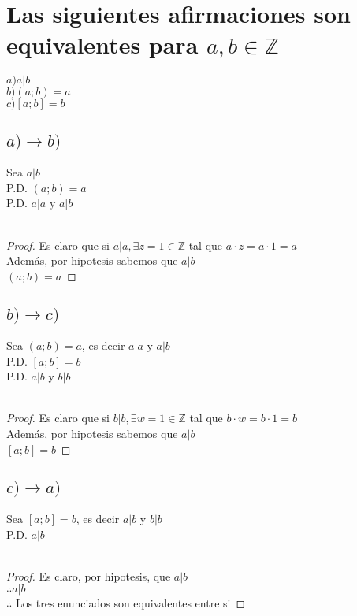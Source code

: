 \documentclass[12pt]{article}
\begin{document}
    \section{Las siguientes afirmaciones son equivalentes para $a,b \in \mathbb{Z}$}
    $a)$\quad $a|b$ \\
    $b)$\quad $(a;b)=a$ \\
    $c)$\quad $[a;b]=b$
        \subsection{$a) \rightarrow b)$}
            Sea $a|b$ \\
            P.D. $(a;b)=a$ \\
            P.D. $a|a$ y $a|b$ \\ \\
            \begin{proof}
                Es claro que si $a|a, \exists z = 1 \in \mathbb{Z}$ tal que $a \cdot z = a \cdot 1 = a$\\
                Además, por hipotesis sabemos que $a|b$\\
                \qquad \therefore $(a;b)=a$
            \end{proof}
        \subsection{$b) \rightarrow c)$}
            Sea $(a;b)=a$, es decir $a|a$  y $a|b$\\
            P.D. $[a;b]=b$ \\
            P.D. $a|b$ y $b|b$ \\ \\
            \begin{proof}
                Es claro que si $b|b, \exists w =1 \in \mathbb{Z}$ tal que $b \cdot w = b \cdot 1 = b$ \\
                Además, por hipotesis sabemos que $a|b$\\
                \qquad \therefore $[a;b]=b$
            \end{proof}
        \subsection{$c) \rightarrow a)$}
            Sea $[a;b]=b$, es decir $a|b$ y $b|b$ \\
            P.D. $a|b$\\ \\
            \begin{proof}
                Es claro, por hipotesis, que $a|b$ \\
                $\therefore a|b$ \\
                $\therefore $ Los tres enunciados son equivalentes entre si \quad \blacksquare
            \end{proof}
\end{document}
